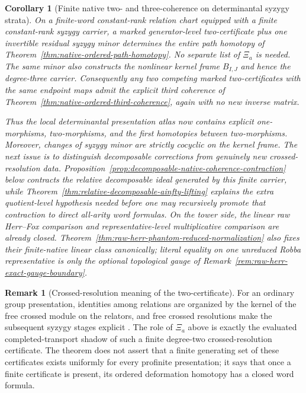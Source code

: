 \documentclass[11pt]{article}
\newtheorem{corollary}[theorem]{Corollary}
\theoremstyle{definition}
\newtheorem{remark}[theorem]{Remark}
\begin{document}
\begin{corollary}[Finite native two- and three-coherence on determinantal syzygy strata]\label{cor:native-two-coherence-determinantal}
On a finite-word constant-rank relation chart equipped with a finite
constant-rank syzygy carrier, a marked generator-level two-certificate plus
one invertible residual syzygy minor determines the entire path homotopy of
Theorem~\ref{thm:native-ordered-path-homotopy}.  No separate list of
$\Xi_a$ is needed.  The same minor also constructs the nonlinear kernel frame
$B_{I,J}$ and hence the degree-three carrier.  Consequently any two competing
marked two-certificates with the same endpoint maps admit the explicit third
coherence of Theorem~\ref{thm:native-ordered-third-coherence}, again with no
new inverse matrix.

Thus the local determinantal presentation atlas now contains explicit
one-morphisms, two-morphisms, and the first homotopies between two-morphisms.
Moreover, changes of syzygy minor are strictly cocyclic on the kernel frame.
The next issue is to distinguish decomposable corrections from genuinely new
crossed-resolution data.  Proposition~\ref{prop:decomposable-native-coherence-contraction}
below contracts the relative decomposable ideal generated by this finite carrier,
while Theorem~\ref{thm:relative-decomposable-ainfty-lifting} explains the extra
quotient-level hypothesis needed before one may recursively promote that
contraction to direct all-arity word formulas.  On the tower side, the linear raw Herr--Fox comparison and representative-level multiplicative comparison are already closed.  Theorem~\ref{thm:raw-herr-phantom-reduced-normalization} also fixes their finite-native linear class canonically; literal equality on one unreduced Robba representative is only the optional topological gauge of Remark~\ref{rem:raw-herr-exact-gauge-boundary}.
\end{corollary}

\begin{remark}[Crossed-resolution meaning of the two-certificate]\label{rem:crossed-resolution-two-certificate}
For an ordinary group presentation, identities among relations are organized
by the kernel of the free crossed module on the relators, and free crossed
resolutions make the subsequent syzygy stages explicit
\cite{BrownRazakCrossed,HuebschmannCrossed}.  The role of
$\Xi_a$ above is exactly the evaluated completed-transport shadow of such a
finite degree-two crossed-resolution certificate.  The theorem does not
assert that a finite generating set of these certificates exists uniformly
for every profinite presentation; it says that once a finite certificate is
present, its ordered deformation homotopy has a closed word formula.
\end{remark}
\end{document}

